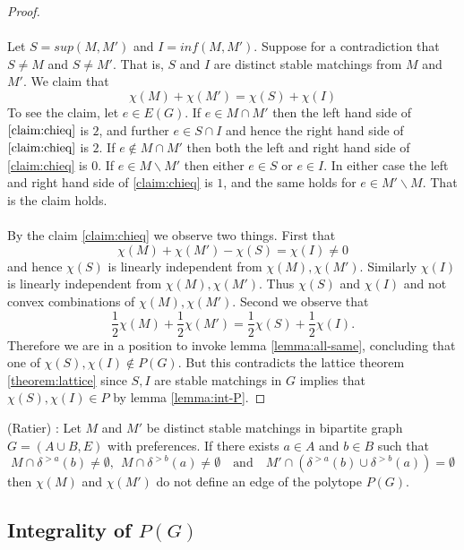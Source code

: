 \begin{proof}
\paragraph{}
Let $S = sup(M,M')$ and $I = inf(M,M')$. Suppose for a contradiction that $S \neq M$ and $S \neq M'$. That is, $S$ and $I$ are distinct stable matchings from $M$ and $M'$. We claim that
\begin{equation} \label{claim:chieq}
\chi(M) + \chi(M') = \chi(S) + \chi(I)
 \end{equation}
To see the claim, let $e \in E(G)$. If $e \in M \cap M'$ then the left hand side of $\ref{claim:chieq}$ is $2$, and further $e \in S \cap I$ and hence the right hand side of $\ref{claim:chieq}$ is $2$. If $e \not\in M \cap M'$ then both the left and right hand side of \ref{claim:chieq} is $0$. If $e \in M \backslash M'$ then either $e \in S$ or $e \in I$. In either case the left and right hand side of \ref{claim:chieq} is $1$, and the same holds for $e \in M' \backslash M$. That is the claim holds.
\paragraph{}
By the claim \ref{claim:chieq} we observe two things. First that
$$ \chi(M) + \chi(M') - \chi(S) = \chi(I) \neq 0$$
and hence $\chi(S)$ is linearly independent from $\chi(M), \chi(M')$. Similarly $\chi(I)$ is linearly independent from $\chi(M), \chi(M')$. Thus $\chi(S)$ and $\chi(I)$ and not convex combinations of $\chi(M), \chi(M')$. Second we observe that $$\frac{1}{2}\chi(M) + \frac{1}{2} \chi(M') = \frac{1}{2} \chi(S) + \frac{1}{2} \chi(I).$$
Therefore we are in a position to invoke lemma \ref{lemma:all-same}, concluding that one of $\chi(S), \chi(I) \not\in P(G)$. But this contradicts the lattice theorem \ref{theorem:lattice} since $S, I$ are stable matchings in $G$ implies that $\chi(S), \chi(I) \in P$  by lemma \ref{lemma:int-P}.
\end{proof}
\begin{corollary}\label{cor:edge} (Ratier) \cite{ratier1996stable}:
Let $M$ and $M'$ be distinct stable matchings in bipartite graph $G=(A\cup B, E)$ with preferences. If there exists $a \in A$ and $b \in B$ such that
\begin{equation}\label{cond:nonedge}
M \cap \delta^{>a}(b) \neq \emptyset,\ \ M\cap \delta^{>b}(a) \neq \emptyset \quad\text{and}\quad M' \cap(\delta^{>a}(b) \cup \delta^{>b}(a)) = \emptyset \end{equation}
then $\chi(M)$ and $\chi(M')$ do not define an edge of the polytope $P(G)$.
\end{corollary}
\subsection{Integrality of $P(G)$}